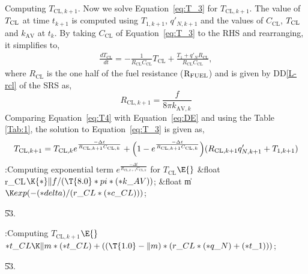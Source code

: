 \documentclass[letterpaper,12pt,baseclass=report]{cweb-hy}
\begin{document}
{
\fi

Computing ${T_{\text{CL},k+1}}$.
Now we solve Equation~\ref{eq:T_3} for ${T_{\text{CL},k+1}}$. The value of $T_{%
\text{CL}}$
at time $t_{k+1}$ is computed
using $T_{1,k+1}$, $q'_{N,k+1}$ and the values of  $C_{\text{CL}}$, $T_{%
\text{CL}}$ and
$k_{\text{AV}}$ at $t_{k}$.
By taking $C_{\text{CL}}$ of Equation~\ref{eq:T_3} to the RHS and rearranging,
it simplifies to,
\begin{align}
\frac{dT_{\text{CL}}}{dt} =-\frac{1}{R_{\text{CL}} C_{\text{CL}}}T_{\text{CL}}+
\frac{T_1+q'_N R_{\text{CL}}}{R_{\text{CL}}C_{\text{CL}}}, \label{eq:T4}
\end{align}
where $R_{\text{CL}}$ is the one half of the fuel resistance ($\rm{ R_{FUEL}}$)
and is given
by DD\ref{L-rcl} of the SRS as,
\begin{equation}
R_{\text{CL},k+1} = \frac {f}{8 \pi k_{\mathrm{AV},k}}
\end{equation}
Comparing Equation~\ref{eq:T4} with Equation~\ref{eq:DE} and using the Table~%
\ref{Tab:1},
the solution to Equation~\ref{eq:T_3} is given as,
\begin{equation}
T_{\text{CL},k+1}=T_{\text{CL},k}e^{\frac{-\Delta t}{R_{\text{CL},k+1} C_{%
\text{CL},k}}} +
\Bigl(1-e^{\frac{-\Delta t}{R_{\text{CL},k+1} C_{\text{CL},k}}}\Bigr) (R_{%
\text{CL},k+1}
q'_{N,k+1} + T_{1,k+1})
\end{equation}
\Y\B\4:Computing exponential term $e^{\frac{-\Delta t}{R_{\text{CL},k+1}
C_{\text{CL},k}}}$ for $T_{\text{CL}}$\X${}\E{}$\6
\&{float} \\{r\_CL}${}\K{*}\|f/(\T{8.0}*\\{pi}*({*}\\{k\_AV})){}$;\6
\&{float} \|m${}\K\\{exp}({-}({*}\\{delta})/(\\{r\_CL}*({*}\\{c\_CL}))){}$;%
\par
\U53.\fi

\Y\B\4:Computing $T_{\text{CL},k+1}$\X${}\E{}$\6
${*}\\{t\_CL}\K\|m*({*}\\{t\_CL})+((\T{1.0}-\|m)*(\\{r\_CL}*({*}\\{q\_N})+({*}%
\\{t\_1}))){}$;\par
\U53.\fi

}
\end{document}
